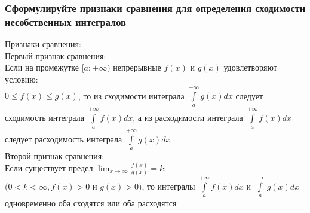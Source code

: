 \documentclass{article}
\begin{document}
\subsubsection{Сформулируйте признаки сравнения для определения сходимости несобственных интегралов}
Признаки сравнения:\\
Первый признак сравнения:\\
Если на промежутке $ [a; +\infty) $ непрерывные $ f(x) $ и $ g(x) $ удовлетворяют условию:\\
$ 0 \le f(x) \le g(x) $, то из сходимости интеграла $ \int\limits^{+\infty}_{a} g(x)dx $ следует сходимость интеграла $ \int\limits^{+\infty}_{a} f(x)dx $, а из расходимости интеграла $ \int\limits^{+\infty}_{a} f(x)dx $ следует расходимость интеграла $ \int\limits^{+\infty}_{a} g(x)dx $\\
Второй признак сравнения:\\
Если существует предел $ \lim_{x\to \infty} \frac{f(x)}{g(x)} = k $:\\
$ (0 < k < \infty, f(x) > 0 $ и $ g(x) > 0) $, то интегралы $ \int\limits^{+\infty}_{a} f(x)dx $ и $ \int\limits^{+\infty}_{a} g(x)dx $ одновременно оба сходятся или оба расходятся
\end{document}
